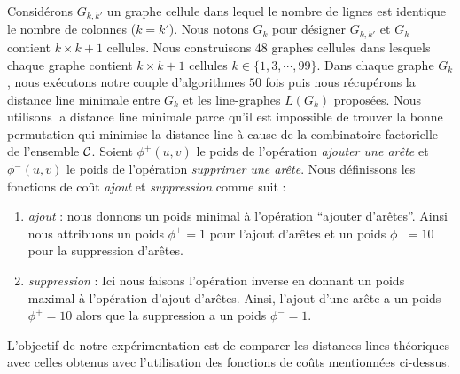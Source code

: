 Consid\'erons $G_{k,k'}$ un graphe cellule dans lequel le nombre de lignes est identique le nombre de colonnes ($k = k'$). Nous notons $G_k$ pour d\'esigner $G_{k,k'}$ et $G_k$ contient $k \times k +1$ cellules.
Nous construisons $48$ graphes cellules dans lesquels chaque graphe contient $k \times k +1$ cellules $k \in \{1,3,\cdots,99\}$.
Dans chaque graphe $G_k$, nous ex\'ecutons  notre couple d'algorithmes $50$ fois puis nous r\'ecup\'erons la distance line  minimale entre $G_k$ et les line-graphes $L(G_k)$ propos\'ees.
Nous utilisons la   distance line  minimale parce qu'il est impossible de trouver la bonne permutation qui minimise la distance line \`a cause de la combinatoire factorielle de l'ensemble $\cal C$.
\newline
Soient $\phi^{+}(u,v)$ le poids de l'op\'eration {\em ajouter une ar\^ete} et $\phi^{-}(u,v)$ le poids de l'op\'eration {\em supprimer une ar\^ete}. 
Nous d\'efinissons les fonctions de co\^ut {\em ajout} et {\em suppression} comme suit :
\begin{enumerate}[label = (\alph*)]
\item {\em ajout} : nous donnons un poids minimal \`a l'op\'eration ``ajouter d'ar\^etes''. Ainsi nous attribuons un poids $\phi^{+} = 1$ pour l'ajout d'ar\^etes et un poids $\phi^{-} = 10$ pour la suppression d'ar\^etes.
\item {\em suppression} : Ici nous faisons l'op\'eration inverse en donnant un poids maximal \`a l'op\'eration d'ajout d'ar\^etes. Ainsi, l'ajout d'une ar\^ete a un poids $\phi^{+} = 10$ alors que la suppression a un poids $\phi^{-} = 1$.
\end{enumerate}
L'objectif de notre exp\'erimentation est de comparer les distances lines th\'eoriques avec celles obtenus avec l'utilisation des fonctions de co\^uts mentionn\'ees ci-dessus.


